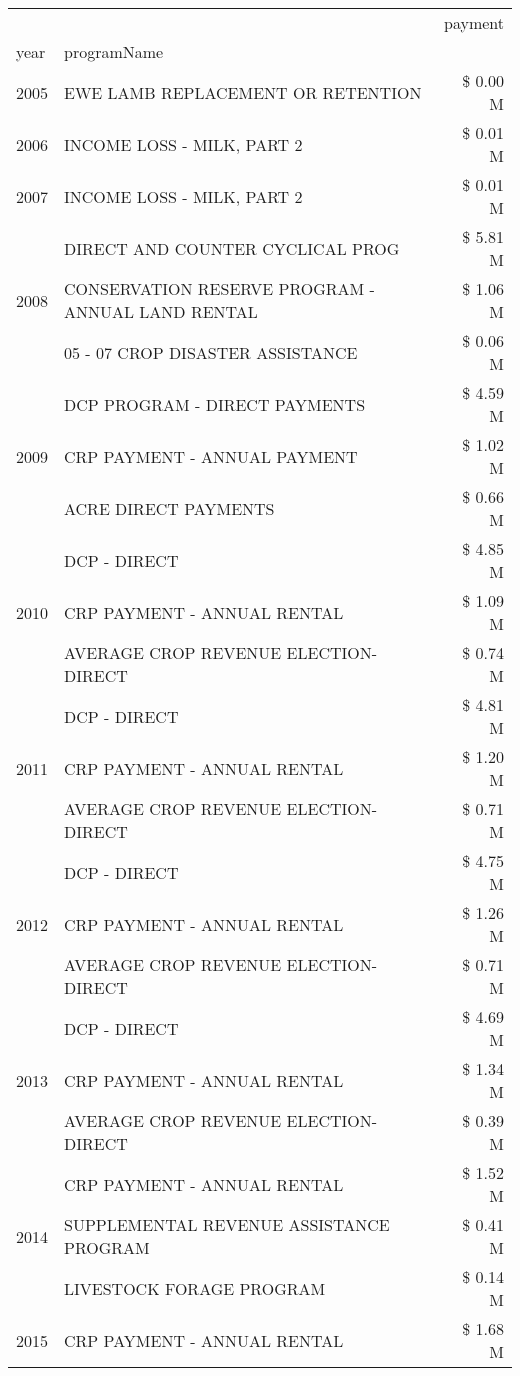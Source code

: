 \begin{tabular}{llr}
\toprule
 &  & payment \\
year & programName &  \\
\midrule
2005 & EWE LAMB REPLACEMENT OR RETENTION & \$ 0.00 M \\
\cline{1-3}
2006 & INCOME LOSS - MILK, PART 2 & \$ 0.01 M \\
\cline{1-3}
2007 & INCOME LOSS - MILK, PART 2 & \$ 0.01 M \\
\cline{1-3}
\multirow[t]{3}{*}{2008} & DIRECT AND COUNTER CYCLICAL PROG & \$ 5.81 M \\
 & CONSERVATION RESERVE PROGRAM - ANNUAL LAND RENTAL & \$ 1.06 M \\
 & 05 - 07 CROP DISASTER ASSISTANCE & \$ 0.06 M \\
\cline{1-3}
\multirow[t]{3}{*}{2009} & DCP PROGRAM - DIRECT PAYMENTS & \$ 4.59 M \\
 & CRP PAYMENT - ANNUAL PAYMENT & \$ 1.02 M \\
 & ACRE DIRECT PAYMENTS & \$ 0.66 M \\
\cline{1-3}
\multirow[t]{3}{*}{2010} & DCP - DIRECT & \$ 4.85 M \\
 & CRP PAYMENT - ANNUAL RENTAL & \$ 1.09 M \\
 & AVERAGE CROP REVENUE ELECTION-DIRECT & \$ 0.74 M \\
\cline{1-3}
\multirow[t]{3}{*}{2011} & DCP - DIRECT & \$ 4.81 M \\
 & CRP PAYMENT - ANNUAL RENTAL & \$ 1.20 M \\
 & AVERAGE CROP REVENUE ELECTION-DIRECT & \$ 0.71 M \\
\cline{1-3}
\multirow[t]{3}{*}{2012} & DCP - DIRECT & \$ 4.75 M \\
 & CRP PAYMENT - ANNUAL RENTAL & \$ 1.26 M \\
 & AVERAGE CROP REVENUE ELECTION-DIRECT & \$ 0.71 M \\
\cline{1-3}
\multirow[t]{3}{*}{2013} & DCP - DIRECT & \$ 4.69 M \\
 & CRP PAYMENT - ANNUAL RENTAL & \$ 1.34 M \\
 & AVERAGE CROP REVENUE ELECTION-DIRECT & \$ 0.39 M \\
\cline{1-3}
\multirow[t]{3}{*}{2014} & CRP PAYMENT - ANNUAL RENTAL & \$ 1.52 M \\
 & SUPPLEMENTAL REVENUE ASSISTANCE PROGRAM & \$ 0.41 M \\
 & LIVESTOCK FORAGE PROGRAM & \$ 0.14 M \\
\cline{1-3}
\multirow[t]{3}{*}{2015} & CRP PAYMENT - ANNUAL RENTAL & \$ 1.68 M \\

\end{tabular}
